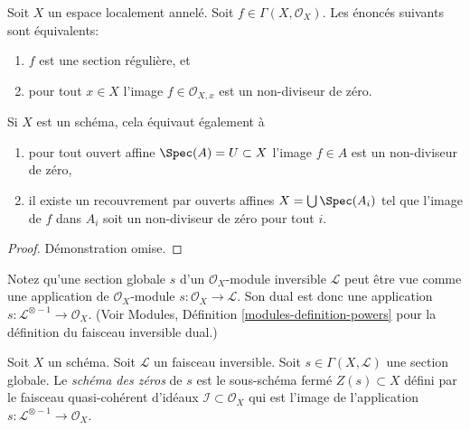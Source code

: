 \begin{lemma}
\label{lemma-regular-section-structure-sheaf}
Soit  $X$  un espace localement annelé. Soit  $f \in \Gamma(X, \mathcal{O}_X)$. Les énoncés
suivants sont équivalents:
\begin{enumerate}
\item $f$  est une section régulière, et
\item pour tout  $x \in X$  l'image  $f \in \mathcal{O}_{X, x}$  est un non-diviseur de zéro.
\end{enumerate}
Si  $X$  est un schéma, cela équivaut également à
\begin{enumerate}
\item[(3)] pour tout ouvert affine  $\Spec(A) = U \subset X$  l'image  $f \in A$  est un non-diviseur de
zéro,
\item[(4)] il existe un recouvrement par ouverts affines  $X = \bigcup \Spec(A_i)$  tel que l'image de
 $f$  dans  $A_i$  soit un non-diviseur de zéro pour tout
 $i$.
\end{enumerate}
\end{lemma}

\begin{proof}
Démonstration omise.
\end{proof}

\noindent
Notez qu'une section globale  $s$  d'un  $\mathcal{O}_X$-module inversible
 $\mathcal{L}$  peut être vue comme une application de  $\mathcal{O}_X$-module
 $s : \mathcal{O}_X \to \mathcal{L}$. Son dual est donc une application  $s : \mathcal{L}^{\otimes -1} \to \mathcal{O}_X$. (Voir Modules,
Définition  \ref{modules-definition-powers}  pour la définition du faisceau inversible dual.)

\begin{definition}
\label{definition-zero-scheme-s}
Soit  $X$  un schéma. Soit  $\mathcal{L}$  un faisceau inversible. Soit
 $s \in \Gamma(X, \mathcal{L})$  une section globale. Le  {\it  schéma des
zéros}  de  $s$  est le sous-schéma fermé  $Z(s) \subset X$  défini par
le faisceau quasi-cohérent d'idéaux  $\mathcal{I} \subset \mathcal{O}_X$  qui est l'image de l'application
 $s : \mathcal{L}^{\otimes -1} \to \mathcal{O}_X$.
\end{definition}

